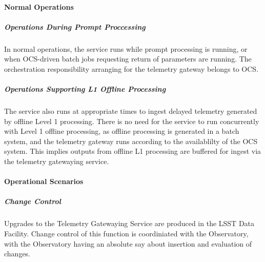 \paragraph{Normal Operations}

\subparagraph{Operations During Prompt Proccessing}

In normal operations, the service runs while prompt processing is running,
or when OCS-driven batch jobs requesting return of parameters are running.  
The orchestration responsibility arranging for the telemetry gateway belongs to OCS.

\subparagraph{Operations Supporting L1 Offline Processing}
The service also runs at appropriate times to ingest delayed telemetry
generated by offline Level 1  processing. There is no need for the service
to run concurrently with Level 1 offline processing, as offline processing is
generated in a batch system, and the telemetry gateway runs according to
the availablilty of the OCS system. This implies outputs from offline L1 processing
are buffered for ingest via the telemetry gatewaying service.

\paragraph{Operational Scenarios}

\subparagraph{Change Control}

Upgrades to the Telemetry Gatewaying Service are produced in the LSST Data Facility. 
Change control of this function is coordiniated with the Observatory, with the 
Observatory having an absolute say about insertion and evaluation of changes.